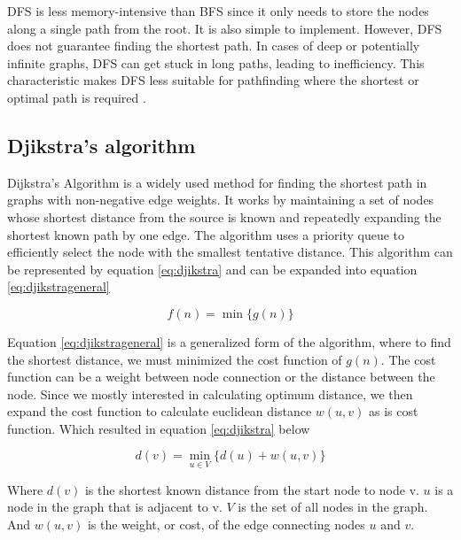 \documentclass[12pt]{report}
\begin{document}
        DFS is less memory-intensive than BFS since it only needs to store the nodes along a single path from the root.
        It is also simple to implement. However, DFS does not guarantee finding the shortest path. In cases of deep or
        potentially infinite graphs, DFS can get stuck in long paths, leading to inefficiency. This characteristic makes
        DFS less suitable for pathfinding where the shortest or optimal path is required \cite{knuth_art_1997}.

        \subsection{Djikstra's algorithm}
        Dijkstra's Algorithm is a widely used method for finding the shortest path in graphs with non-negative edge
        weights. It works by maintaining a set of nodes whose shortest distance from the source is known and repeatedly
        expanding the shortest known path by one edge. The algorithm uses a priority queue to efficiently select the
        node with the smallest tentative distance. This algorithm can be represented by equation \ref{eq:djikstra} and
        can be expanded into equation \ref{eq:djikstrageneral}

        \begin{equation}\label{eq:djikstrageneral}
            f(n) = \min_{} \{ g(n)\}
        \end{equation}

        Equation \ref{eq:djikstrageneral} is a generalized form of the algorithm, where to find the shortest distance,
        we must minimized the cost function of \(g(n)\). The cost function can be a weight between node connection or
        the distance between the node. Since we mostly interested in calculating optimum distance, we then expand the
        cost function to calculate euclidean distance \(w(u,v)\) as is cost function. Which resulted in equation
        \ref{eq:djikstra} below

        \begin{equation}\label{eq:djikstra}
            d(v) = \min_{u \in V} \{ d(u) + w(u, v) \}
        \end{equation}

        Where \(d(v)\) is the shortest known distance from the start node to node v. \(u\) is a node in the graph that
        is adjacent to v. \(V\) is the set of all nodes in the graph. And \(w(u, v)\) is the weight, or cost, of the
        edge connecting nodes \(u\) and \(v\).
\end{document}
